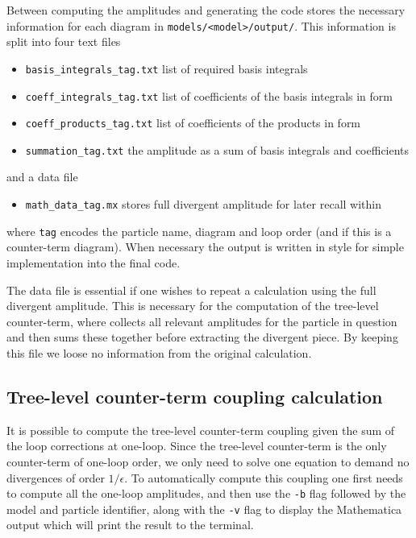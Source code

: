 Between computing the amplitudes and generating the code \mb stores the necessary information for each diagram in \lstinline{models/<model>/output/}.  This information is split into four text files
\begin{itemize}
\item \lstinline{basis_integrals_tag.txt} list of required basis integrals
\item \lstinline{coeff_integrals_tag.txt} list of coefficients of the basis integrals in \CC form
\item \lstinline{coeff_products_tag.txt} list of coefficients of the products in \CC form
\item \lstinline{summation_tag.txt} the amplitude as a sum of basis integrals and coefficients
\end{itemize}
and a \mathematica data file
\begin{itemize}
\item \lstinline{math_data_tag.mx} stores full divergent amplitude for later recall within \mathematica
\end{itemize}
where \lstinline{tag} encodes the particle name, diagram and loop order (and if this is a counter-term diagram).  When necessary the output is written in \CC style for simple implementation into the final code.

The \mathematica data file is essential if one wishes to repeat a calculation using the full divergent amplitude.  This is necessary for the computation of the tree-level counter-term, where \mb collects all relevant amplitudes for the particle in question and then sums these together before extracting the divergent piece.  By keeping this file we loose no information from the original calculation.

\subsection{Tree-level counter-term coupling calculation}\label{sec:ct}

It is possible to compute the tree-level counter-term coupling given the sum of the loop corrections at one-loop.  Since the tree-level counter-term is the only counter-term of one-loop order, we only need to solve one equation to demand no divergences of order $1/\epsilon$.  To automatically compute this coupling one first needs to compute all the one-loop amplitudes, and then use the \lstinline{-b} flag followed by the model and particle identifier, along with the \lstinline{-v} flag to display the Mathematica output which will print the result to the terminal.

